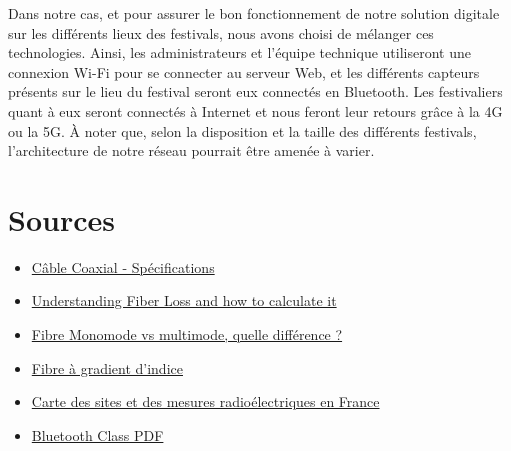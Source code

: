 \documentclass[12]{article}
\begin{document}
Dans notre cas, et pour assurer le bon fonctionnement de notre solution digitale sur les différents lieux des festivals, nous avons choisi de mélanger ces technologies. Ainsi, les administrateurs et l'équipe technique utiliseront une connexion Wi-Fi pour se connecter au serveur Web, et les différents capteurs présents sur le lieu du festival seront eux connectés en Bluetooth. Les festivaliers quant à eux seront connectés à Internet et nous feront leur retours grâce à la 4G ou la 5G. À noter que, selon la disposition et la taille des différents festivals, l'architecture de notre réseau pourrait être amenée à varier.

 

\newpage
\section*{Sources}

\begin{itemize}{\textwidth}
    \item [$\bullet$] \href{http://f5ad.free.fr/ANT-QSP_F5AD_Pertes-ROS-cable-coaxial.htm}{Câble Coaxial - Spécifications}

    \item [$\bullet$] \href{https://community.fs.com/fr/article/understanding-fiber-loss-what-is-it-and-how-to-calculate-it.html}{Understanding Fiber Loss and how to calculate it}

    \item [$\bullet$] \href{https://www.optcore.net/fr/single-mode-vs-multimode-fiber-difference/}{Fibre Monomode vs multimode, quelle différence ?}

    \item [$\bullet$]\href{https://www.thefoa.org/FR/Chapitre%205.htm#:~:text=La%20fibre%20multimode%20%C3%A0%20gradient,jusqu'%C3%A0%20environ%202%20gigahertz}{Fibre à gradient d'indice}

    \item [$\bullet$] \href{https://www.cartoradio.fr}{Carte des sites et des mesures radioélectriques en France}

    \item [$\bullet$] \href{https://www.bag.admin.ch/dam/bag/fr/dokumente/str/nis/faktenblaetter-emf/faktenblatt-bluetooth.pdf.download.pdf/faktenblatt%20bluetooth%20f.pdf}{Bluetooth Class PDF}

\end{itemize}
\end{document}
